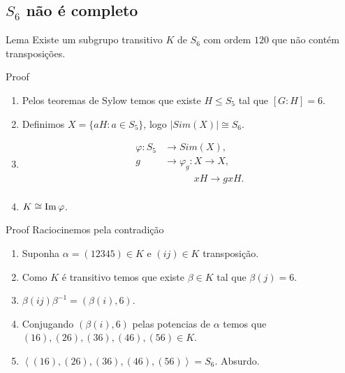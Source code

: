 \subsection{$S_6$ não é completo}
\begin{frame}{}
  \begin{block}{Lema}
    Existe um subgrupo transitivo $K$ de $S_6$ com ordem $120$ que não contém transposições. 
  \end{block}
  \begin{block}{Proof}
    \begin{enumerate}
      \item Pelos teoremas de Sylow temos que existe $H\leq S_5$ tal que $[G:H]=6$.\\
      \item Definimos $X=\{aH:a\in S_5\}$, logo $|Sim(X)|\cong S_6$.
      \item 
        \begin{align*}
          \varphi:S_5&\to Sim(X),\\
                  g&\to \varphi_g:X\to X,\\
        \phantom{g}&\phantom{\to \varphi_g:}xH\to gxH.
        \end{align*}
      \item $K\cong \operatorname{Im}\varphi$.
    \end{enumerate}
  \end{block}
\end{frame}
\begin{frame}{}
  \begin{block}{Proof}
    Raciocinemos pela contradição
    \begin{enumerate}
      \item Suponha $\alpha=(12345)\in K$ e $(ij)\in K$ transposição.
      \item Como $K$ é transitivo temos que existe $\beta\in K$ tal que $\beta(j)=6$.
      \item $\beta(ij)\beta^{-1}=(\beta(i),6)$.
      \item Conjugando $(\beta(i),6)$ pelas potencias de $\alpha$ temos que $(16),(26),(36),(46),(56)\in K$.
      \item $\left\langle (16),(26),(36),(46),(56) \right\rangle=S_6$. Absurdo.
    \end{enumerate}        
  \end{block}
\end{frame}
